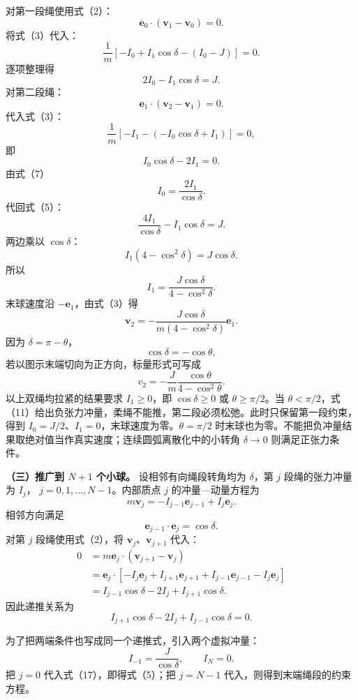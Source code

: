 \documentclass[12pt,a4paper,UTF8]{ctexart}
\begin{document}
对第一段绳使用式（2）： \[
\boldsymbol e_0\cdot(\boldsymbol v_1-\boldsymbol v_0)=0. \tag{4}
\] 将式（3）代入： \[
\frac1m\left[-I_0+I_1\cos\delta-(I_0-J)\right]=0.
\] 逐项整理得 \[
\boxed{
2I_0-I_1\cos\delta=J
}. \tag{5}
\] 对第二段绳： \[
\boldsymbol e_1\cdot(\boldsymbol v_2-\boldsymbol v_1)=0. \tag{6}
\] 代入式（3）： \[
\frac1m\left[
-I_1-\left(-I_0\cos\delta+I_1\right)
\right]=0,
\] 即 \[
\boxed{
I_0\cos\delta-2I_1=0
}. \tag{7}
\] 由式（7） \[
I_0=\frac{2I_1}{\cos\delta}. \tag{8}
\] 代回式（5）： \[
\frac{4I_1}{\cos\delta}-I_1\cos\delta=J. \tag{9}
\] 两边乘以 \(\cos\delta\)： \[
I_1\left(4-\cos^2\delta\right)=J\cos\delta. \tag{10}
\] 所以 \[
I_1=\frac{J\cos\delta}{4-\cos^2\delta}. \tag{11}
\] 末球速度沿 \(-\boldsymbol e_1\)，由式（3）得 \[
\boxed{
\boldsymbol v_2
=-\frac{J\cos\delta}
{m(4-\cos^2\delta)}
\boldsymbol e_1
}. \tag{12}
\] 因为 \(\delta=\pi-\theta\)， \[
\cos\delta=-\cos\theta,
\] 若以图示末端切向为正方向，标量形式可写成 \[
\boxed{
v_2=-\frac{J}{m}
\frac{\cos\theta}{4-\cos^2\theta}
}. \tag{13}
\] 以上双绳均拉紧的结果要求 \(I_1\ge0\)，即 \(\cos\delta\ge0\) 或
\(\theta\ge\pi/2\)。当
\(\theta<\pi/2\)，式（11）给出负张力冲量，柔绳不能推，第二段必须松弛。此时只保留第一段约束，得到
\(I_0=J/2\)、\(I_1=0\)，末球速度为零。\(\theta=\pi/2\)
时末球也为零。不能把负冲量结果取绝对值当作真实速度；连续圆弧离散化中的小转角
\(\delta\to0\) 则满足正张力条件。

\textbf{（三）推广到 \(N+1\) 个小球。} 设相邻有向绳段转角均为
\(\delta\)，第 \(j\) 段绳的张力冲量为 \(I_j\)，
\(j=0,1,\ldots,N-1\)。内部质点 \(j\) 的冲量---动量方程为 \[
m\boldsymbol v_j
=-I_{j-1}\boldsymbol e_{j-1}
+I_j\boldsymbol e_j. \tag{14}
\] 相邻方向满足 \[
\boldsymbol e_{j-1}\cdot\boldsymbol e_j=\cos\delta. \tag{15}
\] 对第 \(j\) 段绳使用式（2），将
\(\boldsymbol v_j\)、\(\boldsymbol v_{j+1}\) 代入： \[
\begin{aligned}
0
&=m\boldsymbol e_j\cdot
(\boldsymbol v_{j+1}-\boldsymbol v_j)\\
&=\boldsymbol e_j\cdot
\left[
-I_j\boldsymbol e_j+I_{j+1}\boldsymbol e_{j+1}
+I_{j-1}\boldsymbol e_{j-1}-I_j\boldsymbol e_j
\right]\\
&=I_{j-1}\cos\delta-2I_j+I_{j+1}\cos\delta.
\end{aligned} \tag{16}
\] 因此递推关系为 \[
\boxed{
I_{j+1}\cos\delta-2I_j+I_{j-1}\cos\delta=0
}. \tag{17}
\]

为了把两端条件也写成同一个递推式，引入两个虚拟冲量： \[
\boxed{
I_{-1}=\frac{J}{\cos\delta},
\qquad
I_N=0
}. \tag{18}
\] 把 \(j=0\) 代入式（17），即得式（5）；把 \(j=N-1\)
代入，则得到末端绳段的约束方程。
\end{document}
